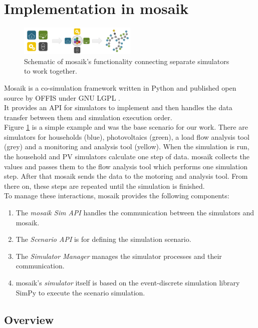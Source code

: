 \documentclass[conference]{IEEEtran}
\begin{document}
\section{Implementation in mosaik}
	
	\begin{figure}[!htp]
		\includegraphics[width=0.5\textwidth]{pics/mosaik-slide.png}
		\caption{Schematic of mosaik's functionality connecting separate simulators to work together. \cite{mosaik}}
		\label{img:mosaik_schematic}
	\end{figure}
	
	Mosaik is a co-simulation framework written in Python and published open source by OFFIS under GNU LGPL \cite{mosaik}. \\
	It provides an API for simulators to implement and then handles the data transfer between them and simulation execution order. \\
	Figure \ref{img:mosaik_schematic} is a simple example and was the base scenario for our work. There are simulators for households (blue), photovoltaics (green), a load flow analysis tool (grey) and a monitoring and analysis tool (yellow). When the simulation is run, the household and PV simulators calculate one step of data. mosaik collects the values and passes them to the flow analysis tool which performs one simulation step. After that mosaik sends the data to the motoring and analysis tool. From there on, these steps are repeated until the simulation is finished. \\
	To manage these interactions, mosaik provides the following components:
	\begin{enumerate}
		\item The \textit{mosaik Sim API} handles the communication between the simulators and mosaik.
		\item The \textit{Scenario API} is for defining the simulation scenario.
		\item The \textit{Simulator Manager} manages the simulator processes and their communication.
		\item mosaik's \textit{simulator} itself is based on the event-discrete simulation library SimPy to execute the scenario simulation.
	\end{enumerate}

	\subsection{Overview}
	
\end{document}
